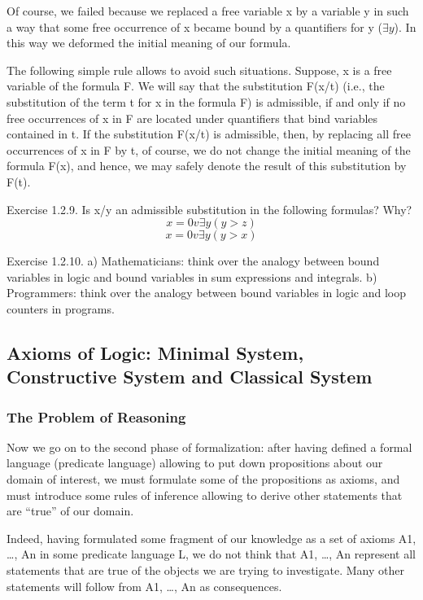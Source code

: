 Of course, we failed because we replaced a free variable x by a variable y in such a way that some free occurrence of x became bound by a quantifiers for y (\(\exists y\)). In this way we deformed the initial meaning of our formula.

The following simple rule allows to avoid such situations. Suppose, x is a free variable of the formula F.  We will say that the substitution F(x/t) (i.e., the substitution of the term t for x in the formula F) is admissible, if and only if no free occurrences of x in F are located under quantifiers that bind variables contained in t. If the substitution F(x/t) is admissible, then, by replacing all free occurrences of x in F by t, of course, we do not change the initial meaning of the formula F(x), and hence, we may safely denote the result of this substitution by F(t).

Exercise 1.2.9. Is x/y an admissible substitution in the following formulas? Why?
\[x=0 v \exists y(y>z)\]
\[x=0 v \exists y(y>x)\]

Exercise 1.2.10. a) Mathematicians: think over the analogy between bound variables in logic and bound
variables in sum expressions and integrals.
b) Programmers: think over the analogy between bound variables in logic and loop counters in programs.

\subsection{Axioms of Logic: Minimal System, Constructive System and Classical System}

\subsubsection*{The Problem of Reasoning}

Now we go on to the second phase of formalization: after having defined a formal language (predicate language) allowing to put down propositions about our domain of interest, we must formulate some of the propositions as axioms, and must introduce some rules of inference allowing to derive other statements that are ``true'' of our domain.

Indeed, having formulated some fragment of our knowledge as a set of axioms A1, \ldots , An in some
predicate language L, we do not think that A1, \ldots , An represent all statements that are true of the objects
we are trying to investigate. Many other statements will follow from A1, \ldots , An as consequences.

